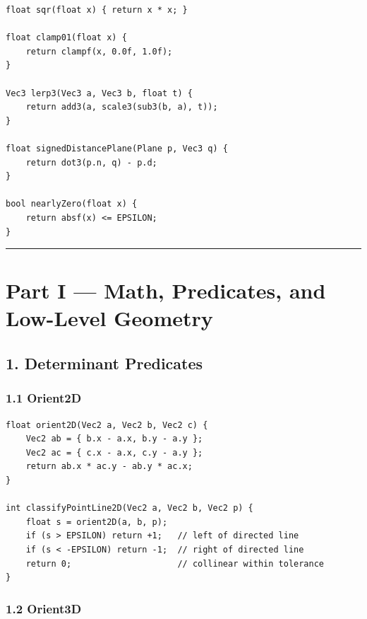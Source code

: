 \documentclass[10pt,letterpaper]{article}
\begin{document}
\begin{verbatim}
float sqr(float x) { return x * x; }

float clamp01(float x) {
    return clampf(x, 0.0f, 1.0f);
}

Vec3 lerp3(Vec3 a, Vec3 b, float t) {
    return add3(a, scale3(sub3(b, a), t));
}

float signedDistancePlane(Plane p, Vec3 q) {
    return dot3(p.n, q) - p.d;
}

bool nearlyZero(float x) {
    return absf(x) <= EPSILON;
}
\end{verbatim}

\medskip\hrule\medskip


\clearpage
{}
\section*{Part I --- Math, Predicates, and Low-Level Geometry}


\subsection*{1. Determinant Predicates}


\subsubsection*{1.1 Orient2D}

\begin{verbatim}
float orient2D(Vec2 a, Vec2 b, Vec2 c) {
    Vec2 ab = { b.x - a.x, b.y - a.y };
    Vec2 ac = { c.x - a.x, c.y - a.y };
    return ab.x * ac.y - ab.y * ac.x;
}

int classifyPointLine2D(Vec2 a, Vec2 b, Vec2 p) {
    float s = orient2D(a, b, p);
    if (s > EPSILON) return +1;   // left of directed line
    if (s < -EPSILON) return -1;  // right of directed line
    return 0;                     // collinear within tolerance
}
\end{verbatim}


\subsubsection*{1.2 Orient3D}
\end{document}
